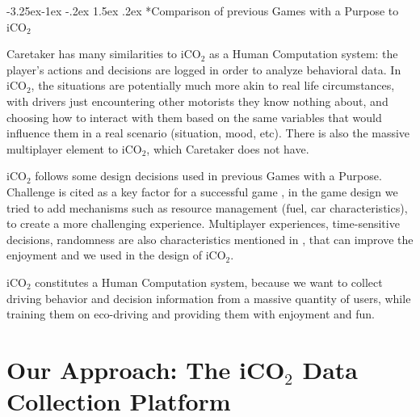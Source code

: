 \documentclass[preprint,authoryear,12pt]{elsarticle}
\makeatletter
\renewcommand{\paragraph}{\@startsection{paragraph}{4}{\z@}%
  {-3.25ex\@plus -1ex \@minus -.2ex}%
  {1.5ex \@plus .2ex}%
  {\normalfont\normalsize\mdseries}}
\makeatother
\begin{document}
\paragraph*{Comparison of previous Games with a Purpose to iCO$_2$}

Caretaker has many similarities to iCO$_2$ as a Human Computation system: the player's actions and decisions are logged in order to analyze behavioral data.
In iCO$_2$, the situations are potentially much more akin to real life circumstances, with drivers just encountering other motorists they know nothing about, and choosing how to interact with them based on the same variables that would influence them in a real scenario (situation, mood, etc). There is also the massive multiplayer element to iCO$_2$, which Caretaker does not have.



iCO$_2$ follows some design decisions used in previous Games with a Purpose. Challenge is cited as a key factor for a successful game \cite{vonAhn.2008}, in the game design we tried to add mechanisms such as resource management (fuel, car characteristics), to create a more challenging experience. Multiplayer experiences, time-sensitive decisions, randomness are also characteristics mentioned in \cite{vonAhn.2008}, that can improve the enjoyment and we used in the design of iCO$_2$.




iCO$_2$ constitutes a Human Computation system, because we want to collect driving behavior and decision information from a massive quantity of users, while training them on eco-driving and providing them with enjoyment and fun.


\section{Our Approach: The iCO$_2$ Data Collection Platform}\label{sec:platform}
\end{document}
